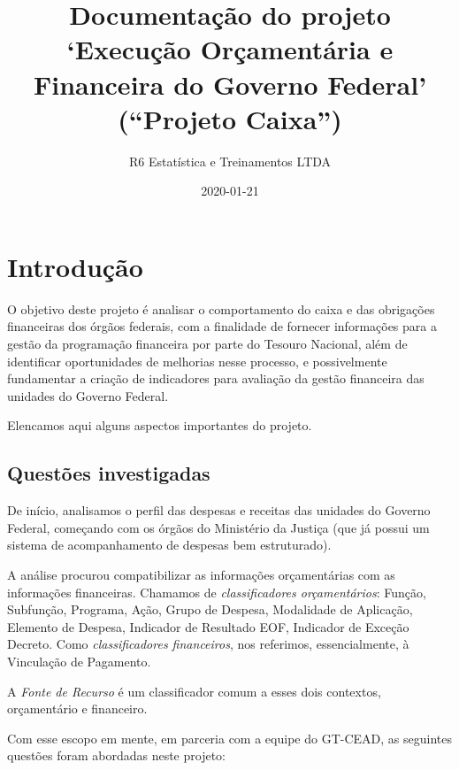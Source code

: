 \documentclass[]{book}
\title{Documentação do projeto `Execução Orçamentária e Financeira do Governo Federal' (``Projeto Caixa'')}
\author{R6 Estatística e Treinamentos LTDA}
\date{2020-01-21}
\begin{document}
\maketitle

{
\setcounter{tocdepth}{1}
\tableofcontents
}
\hypertarget{introducao}{%
\chapter{Introdução}\label{introducao}}

O objetivo deste projeto é analisar o comportamento do caixa e das obrigações financeiras dos órgãos federais, com a finalidade de fornecer informações para a gestão da programação financeira por parte do Tesouro Nacional, além de identificar oportunidades de melhorias nesse processo, e possivelmente fundamentar a criação de indicadores para avaliação da gestão financeira das unidades do Governo Federal.

Elencamos aqui alguns aspectos importantes do projeto.

\hypertarget{questoes-investigadas}{%
\section{Questões investigadas}\label{questoes-investigadas}}

De início, analisamos o perfil das despesas e receitas das unidades do Governo Federal, começando com os órgãos do Ministério da Justiça (que já possui um sistema de acompanhamento de despesas bem estruturado).

A análise procurou compatibilizar as informações orçamentárias com as informações financeiras. Chamamos de \emph{classificadores orçamentários}: Função, Subfunção, Programa, Ação, Grupo de Despesa, Modalidade de Aplicação, Elemento de Despesa, Indicador de Resultado EOF, Indicador de Exceção Decreto. Como \emph{classificadores financeiros}, nos referimos, essencialmente, à Vinculação de Pagamento.

A \emph{Fonte de Recurso} é um classificador comum a esses dois contextos, orçamentário e financeiro.

Com esse escopo em mente, em parceria com a equipe do GT-CEAD, as seguintes questões foram abordadas neste projeto:
\end{document}
